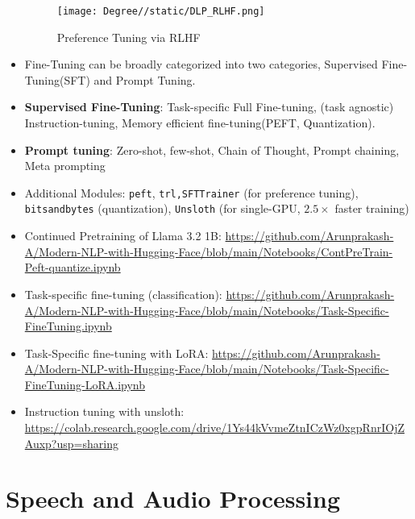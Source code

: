 \documentclass[a4paper]{article}
\begin{document}
\begin{itemize}
    \begin{figure}[H]
        \centering
        \texttt{[image: Degree//static/DLP\_RLHF.png]}
        \caption{Preference Tuning via RLHF}
    \end{figure}
    \item Fine-Tuning can be broadly categorized into two categories, Supervised Fine-Tuning(SFT) and Prompt Tuning.
    \item \textbf{Supervised Fine-Tuning}: Task-specific Full Fine-tuning, (task agnostic) Instruction-tuning, Memory efficient fine-tuning(PEFT, Quantization).
    \item \textbf{Prompt tuning}: Zero-shot, few-shot, Chain of Thought, Prompt chaining, Meta prompting
    \item Additional Modules: \verb|peft|, \verb|trl,SFTTrainer| (for preference tuning), \verb|bitsandbytes| (quantization), \verb|Unsloth| (for single-GPU, $2.5\times$ faster training)
    \item Continued Pretraining of Llama 3.2 1B: \url{https://github.com/Arunprakash-A/Modern-NLP-with-Hugging-Face/blob/main/Notebooks/ContPreTrain-Peft-quantize.ipynb}
    \item Task-specific fine-tuning (classification): \url{https://github.com/Arunprakash-A/Modern-NLP-with-Hugging-Face/blob/main/Notebooks/Task-Specific-FineTuning.ipynb}
    \item Task-Specific fine-tuning with LoRA: \url{https://github.com/Arunprakash-A/Modern-NLP-with-Hugging-Face/blob/main/Notebooks/Task-Specific-FineTuning-LoRA.ipynb}
    \item Instruction tuning with unsloth: \url{https://colab.research.google.com/drive/1Ys44kVvmeZtnICzWz0xgpRnrIOjZAuxp?usp=sharing}
\end{itemize}

\pagebreak
\section{Speech and Audio Processing}
\end{document}
